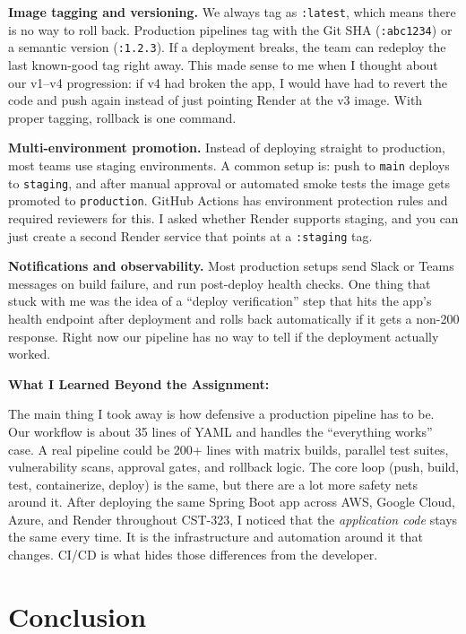 \documentclass[11pt,letterpaper]{article}
\begin{document}
\textbf{Image tagging and versioning.} We always tag as \texttt{:latest}, which means there is no way to roll back. Production pipelines tag with the Git SHA (\texttt{:abc1234}) or a semantic version (\texttt{:1.2.3}). If a deployment breaks, the team can redeploy the last known-good tag right away. This made sense to me when I thought about our v1--v4 progression: if v4 had broken the app, I would have had to revert the code and push again instead of just pointing Render at the v3 image. With proper tagging, rollback is one command.

\textbf{Multi-environment promotion.} Instead of deploying straight to production, most teams use staging environments. A common setup is: push to \texttt{main} deploys to \texttt{staging}, and after manual approval or automated smoke tests the image gets promoted to \texttt{production}. GitHub Actions has environment protection rules and required reviewers for this. I asked whether Render supports staging, and you can just create a second Render service that points at a \texttt{:staging} tag.

\textbf{Notifications and observability.} Most production setups send Slack or Teams messages on build failure, and run post-deploy health checks. One thing that stuck with me was the idea of a ``deploy verification'' step that hits the app's health endpoint after deployment and rolls back automatically if it gets a non-200 response. Right now our pipeline has no way to tell if the deployment actually worked.

\textbf{What I Learned Beyond the Assignment:}

The main thing I took away is how defensive a production pipeline has to be. Our workflow is about 35 lines of YAML and handles the ``everything works'' case. A real pipeline could be 200+ lines with matrix builds, parallel test suites, vulnerability scans, approval gates, and rollback logic. The core loop (push, build, test, containerize, deploy) is the same, but there are a lot more safety nets around it. After deploying the same Spring Boot app across AWS, Google Cloud, Azure, and Render throughout CST-323, I noticed that the \emph{application code} stays the same every time. It is the infrastructure and automation around it that changes. CI/CD is what hides those differences from the developer.

\section{Conclusion}
\end{document}
